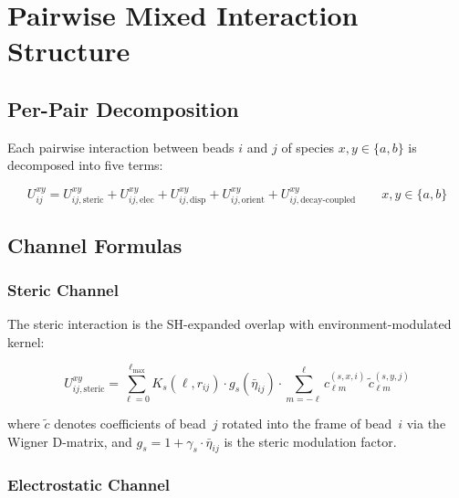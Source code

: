 \documentclass[11pt, a4paper, oneside]{article}
\begin{document}
\section{Pairwise Mixed Interaction Structure}
\label{sec:pairwise}

\subsection{Per-Pair Decomposition}

Each pairwise interaction between beads $i$ and $j$ of species
$x, y \in \{a, b\}$ is decomposed into five terms:

\begin{equation}
\boxed{
U_{ij}^{xy}
= U_{ij,\mathrm{steric}}^{xy}
+ U_{ij,\mathrm{elec}}^{xy}
+ U_{ij,\mathrm{disp}}^{xy}
+ U_{ij,\mathrm{orient}}^{xy}
+ U_{ij,\mathrm{decay\text{-}coupled}}^{xy}
}
\qquad x, y \in \{a, b\}
\label{eq:Uij_xy}
\end{equation}

\subsection{Channel Formulas}

\subsubsection{Steric Channel}

The steric interaction is the SH-expanded overlap with
environment-modulated kernel:

\begin{equation}
U_{ij,\mathrm{steric}}^{xy}
= \sum_{\ell=0}^{\ell_{\max}}
  K_s(\ell, r_{ij})\cdot
  g_s(\bar\eta_{ij})\cdot
  \sum_{m=-\ell}^{\ell} c_{\ell m}^{(s,x,i)}\,\tilde{c}_{\ell m}^{(s,y,j)}
\label{eq:Uij_steric}
\end{equation}

where $\tilde{c}$ denotes coefficients of bead~$j$ rotated into the
frame of bead~$i$ via the Wigner D-matrix, and
$g_s = 1 + \gamma_s\cdot\bar\eta_{ij}$ is the steric modulation factor.

\subsubsection{Electrostatic Channel}
\end{document}
